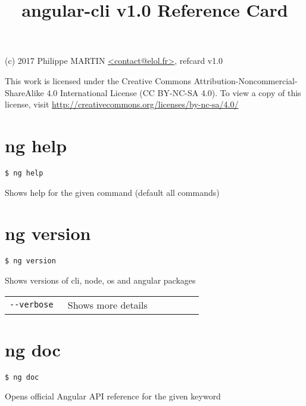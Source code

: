 \documentclass[8pt]{extarticle} %
\begin{document}
\raggedright

\begin{multicols}{3}

\title{angular-cli v1.0 Reference Card}

{\small
(c) 2017 Philippe MARTIN \url{<contact@elol.fr>}, refcard v1.0

This work is licensed under the Creative Commons Attribution-Noncommercial-ShareAlike 
4.0 International License (CC BY-NC-SA 4.0). To view a copy of this license, visit
\url{http://creativecommons.org/licenses/by-nc-sa/4.0/}
}

\vspace*{1pt}

\section*{ng help}
  \vspace{1ex}
  {\tt \$ ng help }

  \vspace{0.6ex}

  {\small Shows help for the given command (default all commands)}

\section*{ng version}

  \vspace{1ex}
  {\tt \$ ng version \itt{[options...]}}

  \vspace{0.6ex}

  {\small Shows versions of cli, node, os and angular packages}

  \vspace{0.6ex}

  \begin{tabular}{L{0.30\linewidth} L{0.70\linewidth}}
    \tt -{}-verbose & \small Shows more details
  \end{tabular}

\section*{ng doc}

  \vspace{1ex}
  {\tt \$ ng doc }

  \vspace{0.6ex}

  {\small Opens official Angular API reference for the given keyword}


\end{multicols}
\end{document}

